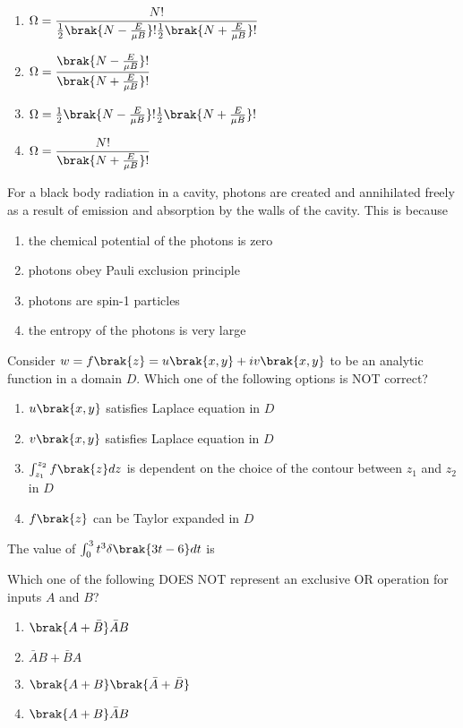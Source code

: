 \begin{enumerate}
    \item $\Omega = \dfrac{N!}{\frac{1}{2}\brak{N - \frac{E}{\mu B}}!\frac{1}{2}\brak{N + \frac{E}{\mu B}}!}$
    \item $\Omega = \dfrac{\brak{N - \frac{E}{\mu B}}!}{\brak{N + \frac{E}{\mu B}}!}$
    \item $\Omega = \frac{1}{2}\brak{N - \frac{E}{\mu B}}!\frac{1}{2}\brak{N + \frac{E}{\mu B}}!$
    \item $\Omega = \dfrac{N!}{\brak{N + \frac{E}{\mu B}}!}$
\end{enumerate}

\item For a black body radiation in a cavity, photons are created and annihilated freely as a result of emission and absorption by the walls of the cavity. This is because  


\begin{enumerate}
    \item the chemical potential of the photons is zero
    \item photons obey Pauli exclusion principle
    \item photons are spin-1 particles
    \item the entropy of the photons is very large
\end{enumerate}

\item Consider $w = f\brak{z} = u\brak{x, y} + iv\brak{x, y}$ to be an analytic function in a domain $D$. Which one of the following options is NOT correct?

\begin{enumerate}
    \item $u\brak{x, y}$ satisfies Laplace equation in $D$
    \item $v\brak{x, y}$ satisfies Laplace equation in $D$
    \item $\int_{z_1}^{z_2} f\brak{z}dz$ is dependent on the choice of the contour between $z_1$ and $z_2$ in $D$
    \item $f\brak{z}$ can be Taylor expanded in $D$
\end{enumerate}

\item The value of $\int_{0}^{3}t^{3} \delta\brak{3t-6}dt$ is 
\item Which one of the following DOES NOT represent an exclusive OR operation for inputs $A$ and $B$?

\begin{enumerate}
    \item $\brak{A + \bar{B}}\bar{A}B$
    \item $\bar{A}B + \bar{B}A$
    \item $\brak{A + B}\brak{\bar{A} + \bar{B}}$
    \item $\brak{A + B}\bar{A}B$
\end{enumerate}

